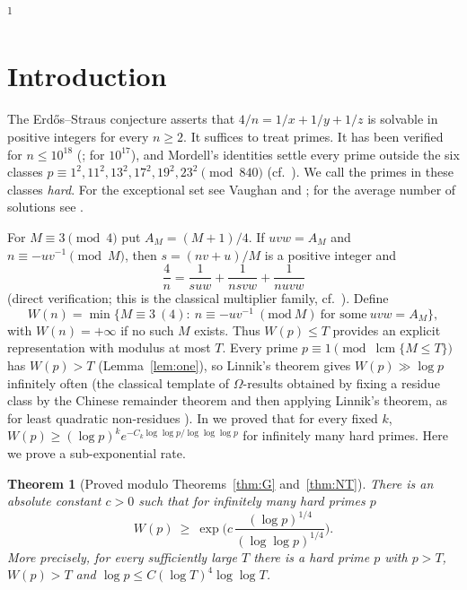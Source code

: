 \documentclass[11pt,reqno]{amsart}
\newtheorem{theorem}{Theorem}[section]
\theoremstyle{definition}
\newcommand{\lcm}{\operatorname{lcm}}
\begin{document}
\maketitle
\hbox{\footnotesize\textsuperscript{1}}

\section{Introduction}

The Erd\H{o}s--Straus conjecture asserts that $4/n=1/x+1/y+1/z$ is solvable
in positive integers for every $n\ge2$.  It suffices to treat primes.  It has
been verified for $n\le10^{18}$ (\cite{MD}; \cite{Salez} for $10^{17}$), and
Mordell's identities settle every prime outside the six classes
$p\equiv1^2,11^2,13^2,17^2,19^2,23^2\pmod{840}$ \cite{Mordell} (cf.\
\cite{Oblath}).  We call the primes in these classes \emph{hard}.  For the
exceptional set see Vaughan \cite{Vaughan} and \cite{PW}; for the average
number of solutions see \cite{ET}.

For $M\equiv3\pmod4$ put $A_M=(M+1)/4$.  If $uvw=A_M$ and
$n\equiv-uv^{-1}\pmod M$, then $s=(nv+u)/M$ is a positive integer and
\begin{equation}\label{eq:ident}
 \frac4n=\frac1{suw}+\frac1{nsvw}+\frac1{nuvw}
\end{equation}
(direct verification; this is the classical multiplier family, cf.\
\cite{Vaughan,ET}).  Define
\begin{equation}\label{eq:W}
 W(n)=\min\{M\equiv3\ (4):\ n\equiv-uv^{-1}\ (\mathrm{mod}\ M)\ \text{for some}\ uvw=A_M\},
\end{equation}
with $W(n)=+\infty$ if no such $M$ exists.  Thus $W(p)\le T$ provides an
explicit representation with modulus at most $T$.  Every prime
$p\equiv1\pmod{\lcm\{M\le T\}}$ has $W(p)>T$ (Lemma~\ref{lem:one}), so
Linnik's theorem gives $W(p)\gg\log p$ infinitely often (the classical template
of $\Omega$-results obtained by fixing a residue class by the Chinese remainder
theorem and then applying Linnik's theorem, as for least quadratic
non-residues \cite{GR}).  In
\cite{Paper1} we proved that for every fixed $k$,
$W(p)\ge(\log p)^{k}e^{-C_k\log\log p/\log\log\log p}$ for infinitely many
hard primes.  Here we prove a sub-exponential rate.

\begin{theorem}[Proved modulo Theorems~\ref{thm:G} and~\ref{thm:NT}]\label{thm:main}
There is an absolute constant $c>0$ such that for infinitely many hard primes $p$
\[
 W(p)\ \ge\ \exp\Big(c\,\frac{(\log p)^{1/4}}{(\log\log p)^{1/4}}\Big).
\]
More precisely, for every sufficiently large $T$ there is a hard prime $p$
with $p>T$, $W(p)>T$ and $\log p\le C(\log T)^{4}\log\log T$.
\end{theorem}
\end{document}
